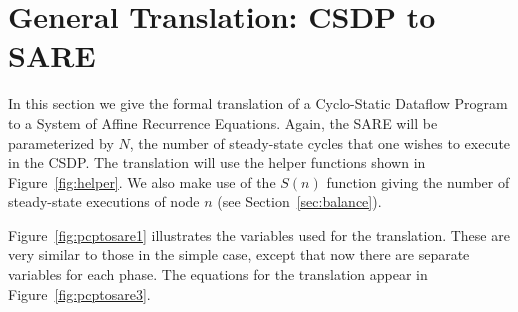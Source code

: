 \section{General Translation: CSDP to SARE}
\label{sec:translate}

In this section we give the formal translation of a Cyclo-Static
Dataflow Program to a System of Affine Recurrence Equations.  Again,
the SARE will be parameterized by $N$, the number of steady-state
cycles that one wishes to execute in the CSDP.  The translation will
use the helper functions shown in Figure~\ref{fig:helper}.  We also
make use of the $S(n)$ function giving the number of steady-state
executions of node $n$ (see Section~\ref{sec:balance}).  



Figure~\ref{fig:pcptosare1} illustrates the variables used for the
translation.  These are very similar to those in the simple case,
except that now there are separate variables for each phase.  The
equations for the translation appear in Figure~\ref{fig:pcptosare3}.